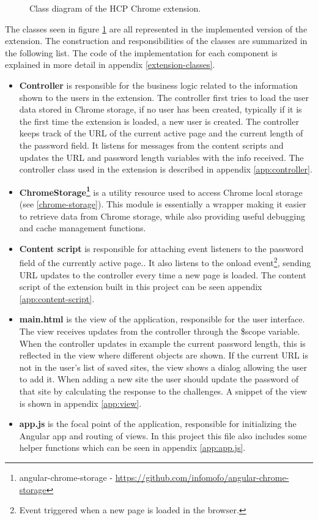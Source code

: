 \begin{figure}[ht]
    \centering
    \caption{Class diagram of the HCP Chrome extension.}
    \label{class-diagram}
\end{figure}

\par The classes seen in figure \ref{class-diagram} are all represented in the implemented version of the extension. The construction and responsibilities of the classes are summarized in the following list. The code of the implementation for each component is explained in more detail in appendix \ref{extension-classes}.

\begin{itemize}
    \item \textbf{Controller} is responsible for the business logic related to the information shown to the users in the extension. The controller first tries to load the user data stored in Chrome storage, if no user has been created, typically if it is the first time the extension is loaded, a new user is created. The controller keeps track of the URL of the current active page and the current length of the password field. It listens for messages from the content scripts and updates the URL and password length variables with the info received. The controller class used in the extension is described in appendix \ref{app:controller}.
    \item \textbf{ChromeStorage\footnote{angular-chrome-storage - \url{https://github.com/infomofo/angular-chrome-storage}}} is a utility resource used to access Chrome local storage (see \autoref{chrome-storage}). This module is essentially a wrapper making it easier to retrieve data from Chrome storage, while also providing useful debugging and cache management functions.
    \item \textbf{Content script} is responsible for attaching event listeners to the password field of the currently active page.. It also listens to the onload event\footnote{Event triggered when a new page is loaded in the browser.}, sending URL updates to the controller every time a new page is loaded. The content script of the extension built in this project can be seen appendix \ref{app:content-script}.
    \item \textbf{main.html} is the view of the application, responsible for the user interface. The view receives updates from the controller through the \$scope variable. When the controller updates in example the current password length, this is reflected in the view where different objects are shown. If the current URL is not in the user's list of saved sites, the view shows a dialog allowing the user to add it. When adding a new site the user should update the password of that site by calculating the response to the challenges. A snippet of the view is shown in appendix \ref{app:view}. 
    \item \textbf{app.js} is the focal point of the application, responsible for initializing the Angular app and routing of views. In this project this file also includes some helper functions which can be seen in appendix \ref{app:app.js}.
\end{itemize}

